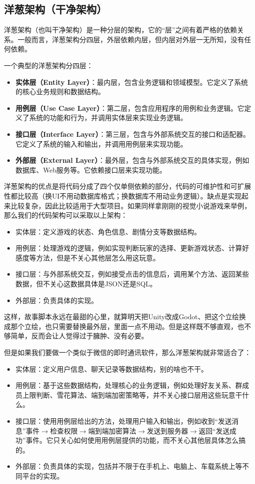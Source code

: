 \subsection{洋葱架构（干净架构）}

洋葱架构（也叫干净架构）是一种分层的架构，它的“层”之间有着严格的依赖关系。一般而言，洋葱架构分四层，外层依赖内层，但内层对外层一无所知，没有任何依赖。

一个典型的洋葱架构分四层：
\begin{itemize}
  \item \textbf{实体层（Entity Layer）}：最内层，包含业务逻辑和领域模型。它定义了系统的核心业务规则和数据结构。
  \item \textbf{用例层（Use Case Layer）}：第二层，包含应用程序的用例和业务逻辑。它定义了系统的功能和行为，并调用实体层来实现业务逻辑。
  \item \textbf{接口层（Interface Layer）}：第三层，包含与外部系统交互的接口和适配器。它定义了系统的输入和输出，并调用用例层来实现功能。
  \item \textbf{外部层（External Layer）}：最外层，包含与外部系统交互的具体实现，例如数据库、Web服务等。它依赖接口层来实现功能。
\end{itemize}

洋葱架构的优点是将代码分成了四个仅单侧依赖的部分，代码的可维护性和可扩展性都比较高（换UI不用动数据库格式；换数据库不用动业务逻辑）。缺点是实现起来比较复杂，因此比较适用于大型项目。如果同样拿刚刚的视觉小说游戏来举例，那么我们的代码架构可以采取以上架构：
\begin{itemize}
  \item 实体层：定义游戏的状态、角色信息、剧情分支等数据结构。
  \item 用例层：处理游戏的逻辑，例如实现判断玩家的选择、更新游戏状态、计算好感度等方法，但是不关心其他层怎么用这玩意。
  \item 接口层：与外部系统交互，例如接受点击的信息后，调用某个方法、返回某些数据，但不关心这数据具体是JSON还是SQL。
  \item 外部层：负责具体的实现。
\end{itemize}
这样，故事脚本永远在最甜的心里，就算明天把Unity改成Godot、把这个立绘换成那个立绘，也只需要替换最外层，里面一点不用动。但是这样既不够直观，也不够简单，反而会让人觉得过于臃肿、没有必要。

但是如果我们要做一个类似于微信的即时通讯软件，那么洋葱架构就非常适合了：
\begin{itemize}
  \item 实体层：定义用户信息、聊天记录等数据结构，别的啥也不干。
  \item 用例层：基于这些数据结构，处理核心的业务逻辑，例如处理好友关系、群成员上限判断、雪花算法、端到端加密策略等，并不关心接口层用这些玩意干什么。
  \item 接口层：使用用例层给出的方法，处理用户输入和输出，例如收到“发送消息”事件$\rightarrow$检查权限$\rightarrow$端到端加密算法$\rightarrow$发送到服务器$\rightarrow$返回“发送成功”事件。它只关心如何使用用例层提供的功能，而不关心其他层具体怎么搞的。
  \item 外部层：负责具体的实现，包括并不限于在手机上、电脑上、车载系统上等不同平台的实现。
\end{itemize}

